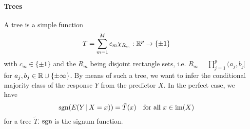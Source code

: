 \paragraph{Trees}
A tree is a simple function
\begin{align}
    T = \sum_{m=1}^M c_m \chi_{R_m}: \mathbb{R}^p \to \{ \pm 1 \}
\end{align}
with $c_m \in \{\pm 1\}$ and the $R_m$ being disjoint rectangle sets, i.e. $R_m = \prod_{j=1}^p 
(a_j, b_j]$ for $a_j, b_j \in \mathbb{R} \cup \{ \pm \infty \}$. By means of such a tree, we want to 
infer the conditional majority class of the response $Y$ from the predictor $X$. In the perfect 
case, we have
\begin{align}\label{eq:rf-major}
    \mathrm{sgn}(E(Y \,|\, X = x)) = \tilde{T}(x) \quad \text{for all } x \in \mathrm{im}(X)
\end{align}
for a tree $\tilde{T}$. $\mathrm{sgn}$ is the signum function.

